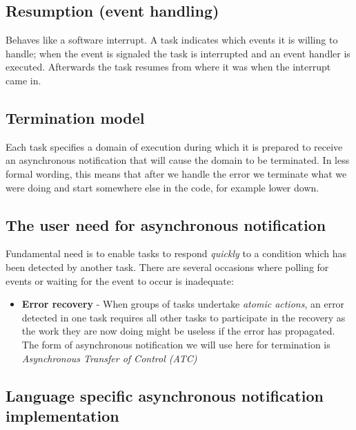 \subsection{Resumption (event handling)}
Behaves like a software interrupt. A task indicates which events it is willing to handle; when the event is signaled the task is interrupted and an event handler is executed. Afterwards the task resumes from where it was when the interrupt came in.

\subsection{Termination model}
Each task specifies a domain of execution during which it is prepared to receive  an asynchronous notification that will cause the domain to be terminated. In less formal wording, this means that after we handle the error we terminate what we were doing and start somewhere else in the code, for example lower down.

\subsection{The user need for asynchronous notification}
Fundamental need is to enable tasks to respond \textit{quickly} to a condition which has been detected by another task. There are several occasions where polling for events or waiting for the event to occur is inadequate:
\begin{itemize}
\item \textbf{Error recovery} - When groups of tasks undertake \textit{atomic actions}, an error detected in one task requires all other tasks to participate in the recovery as the work they are now doing might be useless if the error has propagated. The form of asynchronous notification we will use here for termination is \textit{Asynchronous Transfer of Control (ATC)}
\end{itemize}

\subsection{Language specific asynchronous notification implementation}
